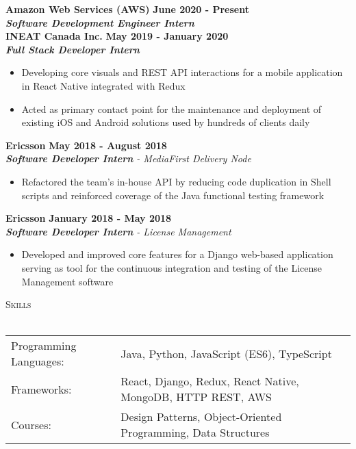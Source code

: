 \documentclass[a4paper]{article}
\newcommand{\lineunder} {
    \vspace*{-8pt} \\
    \hspace*{-18pt} \hrulefill \\
}
\newcommand{\header} [1] {
    {\hspace*{-18pt}\vspace*{6pt} \textsc{#1}}
    \vspace*{-6pt} \lineunder
}
\begin{document}
\textbf{Amazon Web Services (AWS)} \hfill \textbf{June 2020 - Present}\\
\textit{\textbf{Software Development Engineer Intern}}\\
\vspace{5mm}
\textbf{INEAT Canada Inc.} \hfill \textbf{May 2019 - January 2020}\\
\textit{\textbf{Full Stack Developer Intern}}\\
\vspace{0.2mm}
\begin{itemize} \itemsep 0.3pt
	\item Developing core visuals and REST API interactions for a mobile application in React Native integrated with Redux
	\item Acted as primary contact point for the maintenance and deployment of existing iOS and Android solutions used by hundreds of clients daily
\end{itemize}
\textbf{Ericsson} \hfill \textbf{May 2018 - August 2018}\\
\textit{\textbf{Software Developer Intern} - MediaFirst Delivery Node} \\
\vspace{0.2mm}
\begin{itemize} \itemsep 0.3pt
	\item Refactored the team's in-house API by reducing code duplication in Shell scripts and reinforced coverage of the Java functional testing framework
\end{itemize}
\textbf{Ericsson} \hfill \textbf{January 2018 - May 2018}\\
\textit{\textbf{Software Developer Intern} - License Management} \\
\vspace{0.2mm}
\begin{itemize} \itemsep 0.3pt
	\item Developed and improved core features for a Django web-based application serving as tool for the continuous integration and testing of the License Management software
\end{itemize}

\header{Skills}
\vspace*{2mm}
\begin{tabular}{ l l }
	Programming Languages: & Java, Python, JavaScript (ES6), TypeScript                             \\
	Frameworks:            & React, Django, Redux, React Native, MongoDB, HTTP REST, AWS \\
	Courses:               & Design Patterns, Object-Oriented Programming, Data Structures       \\
\end{tabular}
\vspace{2mm}
\end{document}
